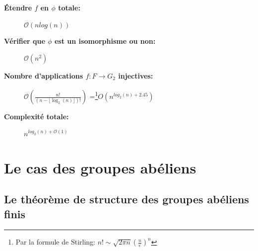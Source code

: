 \documentclass[12pt]{article}
\begin{document}
\begin{description}
    \item[\textbf{Étendre $f$ en $\phi$ totale: }] $\mathcal{O}(nlog(n))$
    \item[\textbf{Vérifier que $\phi$ est un isomorphisme ou non: }] $\mathcal{O}(n^2)$
    \item[\textbf{Nombre d'applications $f: F \xrightarrow[]{} G_2$ injectives: }] $\mathcal{O}\left( \frac{n!}{(n-\lfloor \log_2(n) \rfloor)!} \right)$ =\footnote{Par la formule de Stirling: $n! \sim \sqrt{2\pi n} \left( \frac{n}{e}\right)^n$}$ O(n^{log_2(n) + 2.45})$
    \item[\textbf{Complexité totale: }] $n^{log_2(n) + \mathcal{O}(1)}$
\end{description}



\newpage

\section{Le cas des groupes abéliens}

\subsection{Le théorème de structure des groupes abéliens finis}
\end{document}
